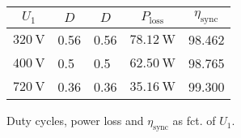 
\begin{solutiontable}[ht]
    \centering  %
    \begin{tabular}{lllll}
        \toprule
        \multicolumn{1}{c}{$U_\mathrm{1}$} & \multicolumn{1}{c}{$D$} & 
        \multicolumn{1}{c}{$D$} & \multicolumn{1}{c}{$P_\mathrm{loss}$} &  
        \multicolumn{1}{c}{$\eta_\mathrm{sync}$} \\
        \midrule 
        $\SI{320}{\volt}$ & 0.56 &  0.56  & $\SI{78.12}{\watt}$ & 98.462 \\ 
        $\SI{400}{\volt}$ & 0.5  &  0.5   & $\SI{62.50}{\watt}$ & 98.765 \\ 
        $\SI{720}{\volt}$ & 0.36 &  0.36  & $\SI{35.16}{\watt}$ & 99.300 \\ 
        \bottomrule
    \end{tabular}
    \caption{Duty cycles, power loss and $\eta_\mathrm{sync}$ as fct. of $U_\mathrm{1}$.}
    \label{table:PowerlossDutyCycleEfficiencySync}
\end{solutiontable}
